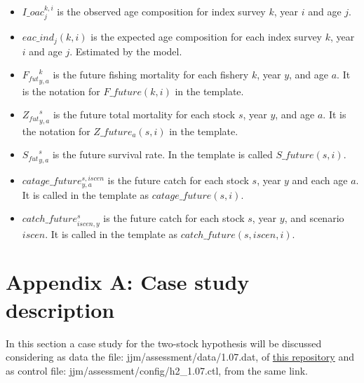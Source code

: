 \documentclass{article}
\begin{document}
\begin{itemize}
    \item $I\_oac^{k,i}_j$ is the observed age composition for index survey $k$, year $i$ and age $j$.
    \item $eac\_ind_j(k,i)$ is the expected age composition for each index survey $k$, year $i$ and age $j$. Estimated by the model.
    \item ${F_{fut}}^{k}_{y,a}$  is the future fishing mortality for each fishery $k$, year $y$, and age $a$. It is the notation for $F\_future(k,i)$ in the template.
    \item ${Z_{fut}}^s_{y,a}$ is the future total mortality for each stock $s$, year $y$, and age $a$. It is the notation for $Z\_future_a(s,i)$ in the template.
    \item ${S_{fut}}^s_{y,a}$ is the future survival rate. In the template is called $S\_future(s,i)$.
    \item $catage\_future^{s,iscen}_{y,a}$ is the future catch for each stock $s$, year $y$ and each age $a$. It is called in the template as 
 $catage\_future(s,i)$.
    \item $catch\_future^s_{iscen,y}$ is the future catch for each stock $s$, year $y$, and scenario $iscen$. It is called in the template as $catch\_future(s,iscen,i)$.
    \end{itemize}
    \newpage
    \section{Appendix A: Case study description} \label{ch: apendicea}

In this section a case study for the two-stock hypothesis will be discussed considering as data the file: jjm/assessment/data/1.07.dat, of \href{https://github.com/SPRFMO/jjm}{this repository} and as control file: jjm/assessment/config/h2\_1.07.ctl, from the same link.\\
\end{document}
